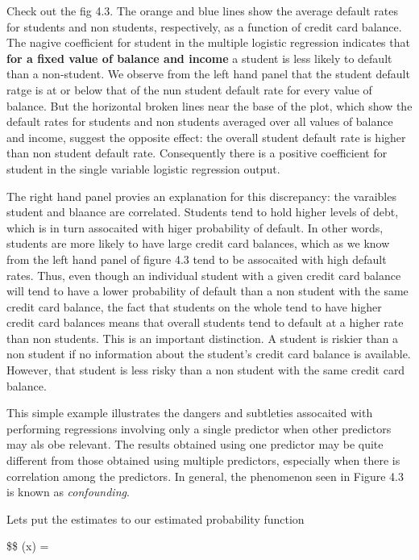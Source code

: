 \documentclass[
  letterpaper,
  DIV=11,
  numbers=noendperiod]{scrreprt}
\begin{document}
{Check out the fig 4.3. The orange and blue lines show the average
default rates for students and non students, respectively, as a function
of credit card balance. The nagive coefficient for student in the
multiple logistic regression indicates that \textbf{for a fixed value of
balance and income} a student is less likely to default than a
non-student. We observe from the left hand panel that the student
default ratge is at or below that of the nun student default rate for
every value of balance. But the horizontal broken lines near the base of
the plot, which show the default rates for students and non students
averaged over all values of balance and income, suggest the opposite
effect: the overall student default rate is higher than non student
default rate. Consequently there is a positive coefficient for student
in the single variable logistic regression output.

The right hand panel provies an explanation for this discrepancy: the
varaibles student and blaance are correlated. Students tend to hold
higher levels of debt, which is in turn assocaited with higer
probability of default. In other words, students are more likely to have
large credit card balances, which as we know from the left hand panel of
figure 4.3 tend to be assocaited with high default rates. Thus, even
though an individual student with a given credit card balance will tend
to have a lower probability of default than a non student with the same
credit card balance, the fact that students on the whole tend to have
higher credit card balances means that overall students tend to default
at a higher rate than non students. This is an important distinction. A
student is riskier than a non student if no information about the
student's credit card balance is available. However, that student is
less risky than a non student with the same credit card balance.

This simple example illustrates the dangers and subtleties assocaited
with performing regressions involving only a single predictor when other
predictors may als obe relevant. The results obtained using one
predictor may be quite different from those obtained using multiple
predictors, especially when there is correlation among the predictors.
In general, the phenomenon seen in Figure 4.3 is known as
\emph{confounding}.

Lets put the estimates to our estimated probability function

\$\$ (x) = 

}
\end{document}
